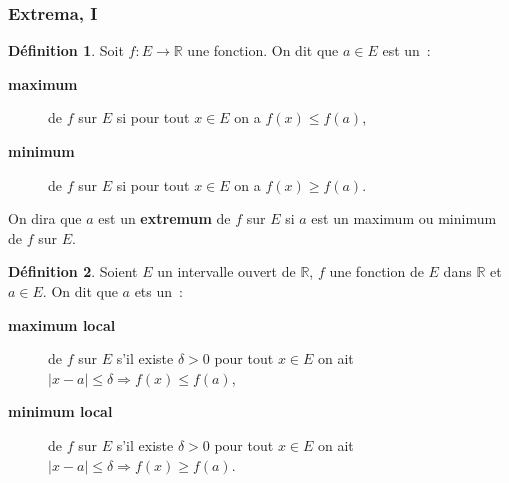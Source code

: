 \documentclass[10pt,notheorems]{beamer}
\theoremstyle{plain}
\theoremstyle{definition} %
\newtheorem{definition}{Définition}
\begin{document}
\begin{frame}
  \frametitle{Extrema, I}
  \hypertarget{slide_extrema_1}{}
  \begin{definition}
    Soit $f: E\rightarrow \mathbb R$ une fonction. On dit que $a\in E$ est un~:
    \begin{description}
    \item[\textbf{maximum}] de $f$ sur $E$ si pour tout $x\in E$ on a $f(x)\leq f(a)$,
    \item[\textbf{minimum}] de $f$ sur $E$ si pour tout $x\in E$ on a $f(x)\geq f(a)$.
    \end{description}
    On dira que $a$ est un \textbf{extremum} de $f$ sur $E$ si $a$ est un maximum ou minimum de $f$ sur $E$.
  \end{definition}

  \bigskip

  \begin{definition}
    Soient $E$ un intervalle ouvert de $\mathbb R$, $f$ une fonction de $E$ dans $\mathbb R$ et $a\in E$. On dit que $a$ ets un~:
    \begin{description}
    \item[\textbf{maximum local}] de $f$ sur $E$ s'il existe $\delta>0$ pour tout $x\in E$ on ait
      $|x-a|\leq\delta \Rightarrow f(x)\leq f(a)$,
    \item[\textbf{minimum local}] de $f$ sur $E$ s'il existe $\delta>0$ pour tout $x\in E$ on ait
      $|x-a|\leq\delta \Rightarrow f(x)\geq f(a)$.
    \end{description}
  \end{definition}

\end{frame}
\end{document}

